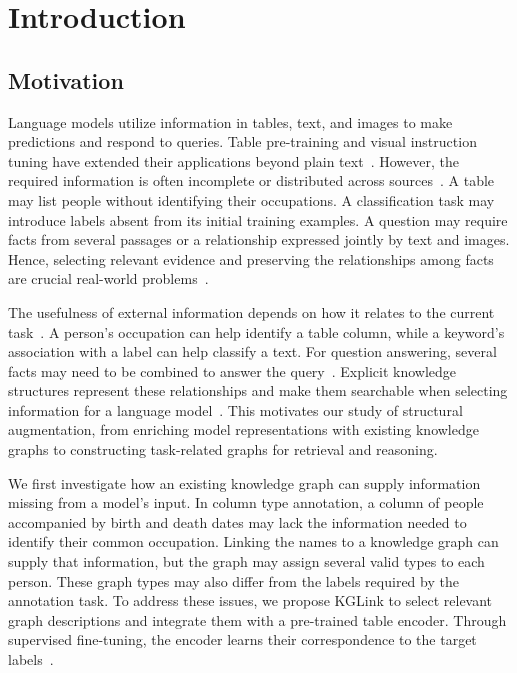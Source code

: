 \chapter{Introduction}
\label{ch:introduction}

\section{Motivation}
\label{sec:introduction:motivation}
Language models utilize information in tables, text, and images to make predictions and respond to queries. Table pre-training and visual instruction tuning have extended their applications beyond plain text~\cite{lit-deng2022turl,lit-liu2023llava}. 
However, the required information is often incomplete or distributed across sources~\cite{bg-reca,bg-mmqa}. A table may list people without identifying their occupations. A classification task may introduce labels absent from its initial training examples. A question may require facts from several passages or a relationship expressed jointly by text and images. 
Hence, selecting relevant evidence and preserving the relationships among facts are crucial real-world problems~\cite{bg-hipporag}.

The usefulness of external information depends on how it relates to the current task~\cite{bg-reca,bg-dpr}. A person's occupation can help identify a table column, while a keyword's association with a label can help classify a text. For question answering, several facts may need to be combined to answer the query~\cite{lit-trivedi2022interleaving}. Explicit knowledge structures represent these relationships and make them searchable when selecting information for a language model~\cite{lit-zhang2024knowgpt}. This motivates our study of structural augmentation, from enriching model representations with existing knowledge graphs to constructing task-related graphs for retrieval and reasoning.

We first investigate how an existing knowledge graph can supply information missing from a model's input. In column type annotation, a column of people accompanied by birth and death dates may lack the information needed to identify their common occupation. Linking the names to a knowledge graph can supply that information, but the graph may assign several valid types to each person. These graph types may also differ from the labels required by the annotation task. To address these issues, we propose KGLink to select relevant graph descriptions and integrate them with a pre-trained table encoder. Through supervised fine-tuning, the encoder learns their correspondence to the target labels~\cite{kglink-publication}.

